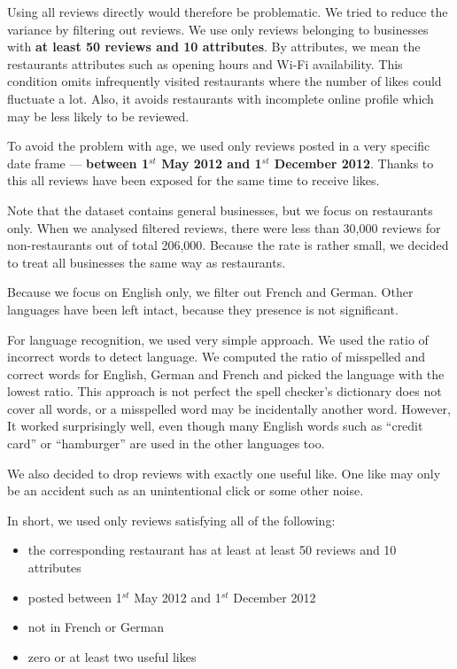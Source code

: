 Using all reviews directly would therefore be problematic.
We tried to reduce the variance by filtering out reviews.
We use only reviews belonging to businesses with \textbf{at least 50 reviews and 10 attributes}.
By attributes, we mean the restaurants attributes such as opening hours and Wi-Fi availability.
This condition omits infrequently visited restaurants where the number of likes could fluctuate a lot.
Also, it avoids restaurants with incomplete online profile which may be less likely to be reviewed.

To avoid the problem with age, we used only reviews posted in a very specific date frame
--- \textbf{between 1$^{st}$ May 2012 and 1$^{st}$ December 2012}.
Thanks to this all reviews have been exposed for the same time to receive likes.

Note that the dataset contains general businesses, but we focus on restaurants only.
When we analysed filtered reviews,
there were less than 30,000 reviews for non-restaurants out of total 206,000.
Because the rate is rather small,
we decided to treat all businesses the same way as restaurants.

Because we focus on English only, we filter out French and German.
Other languages have been left intact, because they presence is not significant.

For language recognition, we used very simple approach.
We used the ratio of incorrect words to detect language.
We computed the ratio of misspelled and correct words for English, German and French and
picked the language with the lowest ratio.
This approach is not perfect the spell checker's dictionary does not cover all words, or a misspelled word may be incidentally another word.
However, It worked surprisingly well, even though many English words such as ``credit card'' or ``hamburger'' are used in the other languages too.

We also decided to drop reviews with exactly one useful like.
One like may only be an accident such as an unintentional click or some other noise.

In short, we used only reviews satisfying all of the following:

\begin{itemize}
	\item the corresponding restaurant has at least at least 50 reviews and 10 attributes
	\item posted between 1$^{st}$ May 2012 and 1$^{st}$ December 2012
	\item not in French or German
	\item zero or at least two useful likes
\end{itemize}

